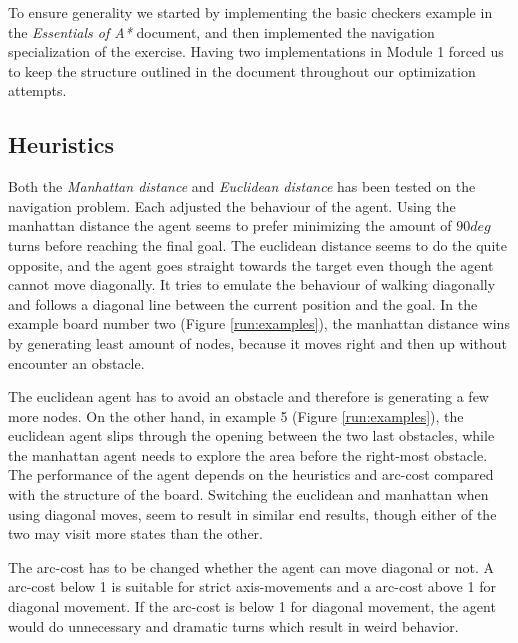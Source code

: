 To ensure generality we started by implementing the basic checkers example in
the \emph{Essentials of A*} document, and then implemented the navigation specialization
of the exercise. Having two implementations in Module 1 forced us to keep the
structure outlined in the document throughout our optimization attempts.

\subsection{Heuristics}
Both the \emph{Manhattan distance} and \emph{Euclidean distance} has been tested on the navigation problem. Each adjusted the behaviour of the agent. Using the manhattan distance the agent seems to prefer minimizing the amount of \(90 deg\) turns before reaching the final goal. The euclidean distance seems to do the quite opposite, and the agent goes straight towards the target even though the agent cannot move diagonally. It tries to emulate the behaviour of walking diagonally and follows a diagonal line between the current position and the goal. In the example board number two (Figure \ref{run:examples}), the manhattan distance wins by generating least amount of nodes, because it moves right and then up without encounter an obstacle. 

The euclidean agent has to avoid an obstacle and therefore is generating a few more nodes. On the other hand, in example 5 (Figure \ref{run:examples}), the euclidean agent slips through the opening between the two last obstacles, while the manhattan agent needs to explore the area before the right-most obstacle. The performance of the agent depends on the heuristics and arc-cost compared with the structure of the board. Switching the euclidean and manhattan when using diagonal moves, seem to result in similar end results, though either of the two may visit more states than the other.

The arc-cost has to be changed whether the agent can move diagonal or not. A arc-cost below 1 is suitable for strict axis-movements and a arc-cost above 1 for diagonal movement. If the arc-cost is below 1 for diagonal movement, the agent would do unnecessary and dramatic turns which result in weird behavior.


